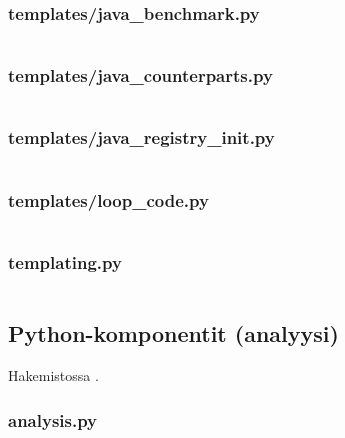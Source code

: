 \documentclass[a4paper,12pt]{article}
\begin{document}
\subsubsection{templates/java\_benchmark.py}
\inputminted[fontsize=\small, linenos, numbersep=5pt, tabsize=4, frame=topline,framesep=0.8cm]{python}{/home/tituomin/StudioProjects/nativebenchmark/script/templates/java_benchmark.py}
\vspace{1cm}
\subsubsection{templates/java\_counterparts.py}
\inputminted[fontsize=\small, linenos, numbersep=5pt, tabsize=4, frame=topline,framesep=0.8cm]{python}{/home/tituomin/StudioProjects/nativebenchmark/script/templates/java_counterparts.py}
\vspace{1cm}
\subsubsection{templates/java\_registry\_init.py}
\inputminted[fontsize=\small, linenos, numbersep=5pt, tabsize=4, frame=topline,framesep=0.8cm]{python}{/home/tituomin/StudioProjects/nativebenchmark/script/templates/java_registry_init.py}
\vspace{1cm}
\subsubsection{templates/loop\_code.py}
\inputminted[fontsize=\small, linenos, numbersep=5pt, tabsize=4, frame=topline,framesep=0.8cm]{python}{/home/tituomin/StudioProjects/nativebenchmark/script/templates/loop_code.py}
\vspace{1cm}
\subsubsection{templating.py}
\inputminted[fontsize=\small, linenos, numbersep=5pt, tabsize=4, frame=topline,framesep=0.8cm]{python}{/home/tituomin/StudioProjects/nativebenchmark/script/templating.py}
\newpage
\subsection{Python-komponentit (analyysi)}
Hakemistossa .
\vspace{1cm}
\subsubsection{analysis.py}
\inputminted[fontsize=\small, linenos, numbersep=5pt, tabsize=4, frame=topline,framesep=0.8cm]{python}{/home/tituomin/StudioProjects/bench-analyzer/analysis.py}
\vspace{1cm}
\end{document}
